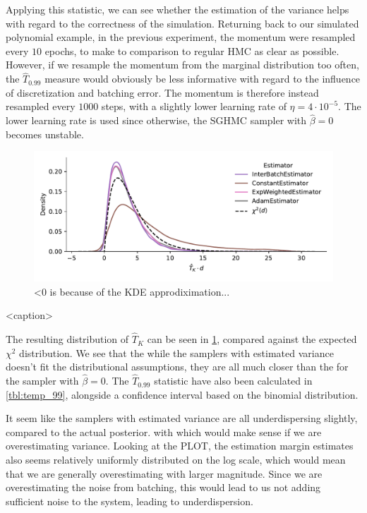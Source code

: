 Applying this statistic, we can see whether the estimation of the variance helps with regard to the correctness of the simulation. 
Returning back to our simulated polynomial example, in the previous experiment, the momentum were resampled every $10$ epochs, to make to comparison to regular HMC as clear as possible. 
However, if we resample the momentum from the marginal distribution too often, the $\hat{T}_{0.99}$ measure would obviously be less informative with regard to the influence of discretization and batching error. 
The momentum is therefore instead resampled every $1000$ steps, with a slightly lower learning rate of $\eta=4 \cdot 10^{-5}$.
The lower learning rate is used since otherwise, the SGHMC sampler with $\hat{\beta}=0$ becomes unstable. 
\begin{figure}[htbp]
    \centering
    \includegraphics[width=\linewidth]{Figures/temperature_sum_chi2_comp.pdf}
    \caption{<0 is because of the KDE approdiximation...}
    \label{fig:temperature_sum_chi2_comp}
\end{figure}

\begin{table}[htbp]
    \centering
    
    \caption{<caption>}
    \label{tbl:temp_99}
\end{table}
The resulting distribution of $\hat{T}_K$ can be seen in \cref{fig:temperature_sum_chi2_comp}, compared against the expected $\chi^2$ distribution. 
We see that the while the samplers with estimated variance doesn't fit the distributional assumptions, they are all much closer than the for the sampler with $\hat \beta = 0$.
The $\hat T_{0.99}$ statistic have also been calculated in \cref{tbl:temp_99}, alongside a confidence interval based on the binomial distribution.

It seem like the samplers with estimated variance are all underdispersing slightly, compared to the actual posterior. with  which would make sense if we are overestimating variance.
Looking at the PLOT, the estimation margin estimates also seems relatively uniformly distributed on the log scale, which would mean that we are generally overestimating with larger magnitude. 
Since we are overestimating the noise from batching, this would lead to us not adding sufficient noise to the system, leading to underdispersion.

